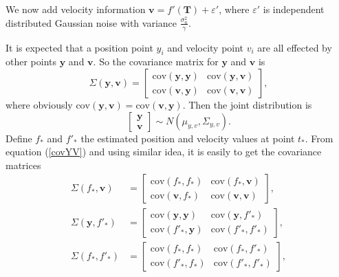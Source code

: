 We now add velocity information $\mathbf{v}=f'(\mathbf{T})+\varepsilon'$, where $\varepsilon'$ is independent distributed Gaussian noise with variance $\frac{\sigma_n^2}{\gamma}$.

It is expected that a position point $y_i$ and velocity point $v_i$ are all effected by other points $\mathbf{y}$ and $\mathbf{v}$. So the covariance matrix for $\mathbf{y}$ and $\mathbf{v}$ is
\begin{equation}\label{covYV}
\Sigma(\mathbf{y},\mathbf{v}) = 
\left[
\begin{matrix}
\text{cov}(\mathbf{y},\mathbf{y}) & \text{cov}(\mathbf{y},\mathbf{v}) \\
\text{cov}(\mathbf{v},\mathbf{y}) & \text{cov}(\mathbf{v},\mathbf{v}) 
\end{matrix}\right],
\end{equation}
where obviously $\text{cov}(\mathbf{y},\mathbf{v}) =\text{cov}(\mathbf{v},\mathbf{y})$. Then the joint distribution  is 
\begin{equation}
\left[
\begin{matrix}
\mathbf{y}\\
\mathbf{v}
\end{matrix}
\right] \sim N(\mu_{y,v},\Sigma_{y,v}).
\end{equation}
Define $f_*$ and $f'_*$ the estimated position and velocity values at point $t_*$. From equation (\ref{covYV}) and using similar idea, it is easily to get the covariance matrices 
\begin{equation}
\begin{split}
\Sigma(f_*,\mathbf{v}) &= 
\left[
\begin{matrix}
\text{cov}(f_*,f_*) & \text{cov}(f_*,\mathbf{v}) \\
\text{cov}(\mathbf{v},f_*) & \text{cov}(\mathbf{v},\mathbf{v}) 
\end{matrix}\right],\\
\Sigma(\mathbf{y},f'_*) &= 
\left[
\begin{matrix}
\text{cov}(\mathbf{y},\mathbf{y}) & \text{cov}(\mathbf{y},f'_*) \\
\text{cov}(f'_*,\mathbf{y}) & \text{cov}(f'_*,f'_*) 
\end{matrix}\right],\\
\Sigma(f_*,f'_*) &= 
\left[
\begin{matrix}
\text{cov}(f_*,f_*) & \text{cov}(f_*,f'_*) \\
\text{cov}(f'_*,f_*) & \text{cov}(f'_*,f'_*) 
\end{matrix}\right],
\end{split}
\end{equation}

